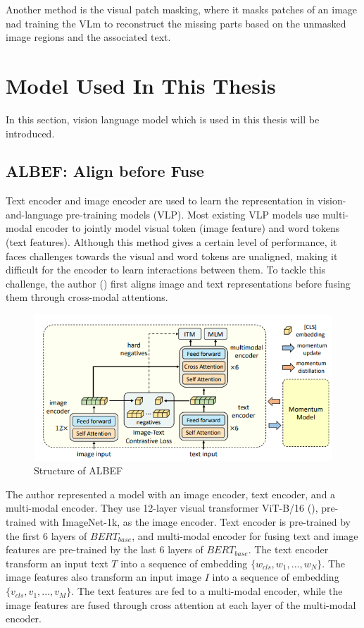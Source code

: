 Another method is the visual patch masking, where it masks patches of an image nad training the VLm to reconstruct the missing parts based on the unmasked image regions and the associated text.

\section{Model Used In This Thesis}
In this section, vision language model which is used in this thesis will be introduced.

\subsection{ALBEF: Align before Fuse}
Text encoder and image encoder are used to learn the representation in vision-and-language pre-training models (VLP). Most existing VLP models use multi-modal encoder to jointly model visual token (image feature) and word tokens (text features). Although this method gives a certain level of performance, it faces challenges towards the visual and word tokens are unaligned, making it difficult for the encoder to learn interactions between them. 
To tackle this challenge, the author (\cite{li2021align}) first aligns image and text representations before fusing them through cross-modal attentions. 

\begin{figure}[htbp]
    \begin{center}
        \includegraphics[width=\linewidth]{img/albef_model_structure.png}
        \caption{Structure of ALBEF}
        \label{fig:albef}
    \end{center}
\end{figure}

The author represented a model with an image encoder, text encoder, and a multi-modal encoder. They use 12-layer visual transformer ViT-B/16 (\cite{dosovitskiy2021image}), pre-trained with ImageNet-1k, as the image encoder. 
Text encoder is pre-trained by the first 6 layers of $BERT_{base}$, and multi-modal encoder for fusing text and image features are pre-trained by the last 6 layers of $BERT_{base}$. The text encoder transform an input text $T$ into a sequence of embedding $\{w_{cls}, w_1, ..., w_N\}$. The image features also transform an input image $I$ into a sequence of embedding $\{v_{cls}, v_1, ..., v_M\}$. The text features are fed to a multi-modal encoder, while the image features are fused through cross attention at each layer of the multi-modal encoder.

